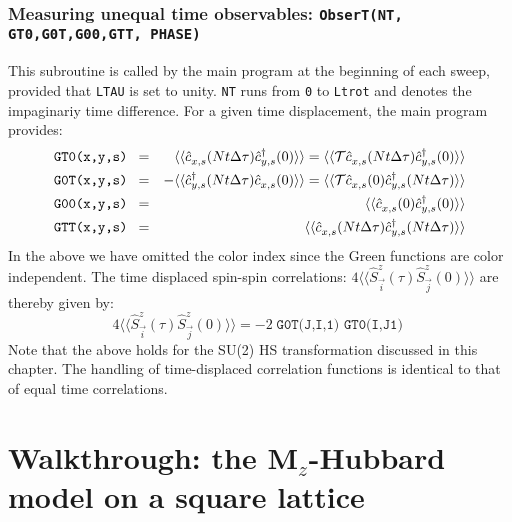 \subsubsection{Measuring  unequal time observables: \texttt{ObserT(NT,  GT0,G0T,G00,GTT, PHASE) }}

This subroutine is called by the main program at the beginning of each sweep, provided that \texttt{LTAU}  is set to unity.  \texttt{NT} runs from \texttt{0}  to \texttt{Ltrot} and denotes the   impaginariy time difference.   For a given time  displacement, the main program provides:
\begin{eqnarray}
\texttt{GT0(x,y,s) }  = & &    \langle \langle \hat{c}^{\phantom\dagger}_{x,s} (Nt \Delta \tau)   \hat{c}^{\dagger}_{y,s} (0)   \rangle \rangle = \langle \langle {\cal T} \hat{c}^{\phantom\dagger}_{x,s} (Nt \Delta \tau)   \hat{c}^{\dagger}_{y,s} (0)   \rangle \rangle  \nonumber \\
\texttt{G0T(x,y,s) }   = &&  -   \langle \langle   \hat{c}^{\dagger}_{y,s} (Nt \Delta \tau)    \hat{c}^{\phantom\dagger}_{x,s} (0)    \rangle \rangle =
    \langle \langle {\cal T} \hat{c}^{\phantom\dagger}_{x,s} (0)    \hat{c}^{\dagger}_{y,s} (Nt \Delta \tau)   \rangle \rangle  \nonumber  \\
  \texttt{G00(x,y,s) }  = & &    \langle \langle \hat{c}^{\phantom\dagger}_{x,s} (0)   \hat{c}^{\dagger}_{y,s} (0)   \rangle \rangle    \nonumber \\
    \texttt{GTT(x,y,s) }  = & &    \langle \langle \hat{c}^{\phantom\dagger}_{x,s} (Nt \Delta \tau)   \hat{c}^{\dagger}_{y,s} (Nt \Delta \tau)   \rangle \rangle    
\end{eqnarray}
In the above we have omitted the color index since  the  Green functions are color independent.  The time displaced  spin-spin correlations: 
$ 4 \langle \langle \hat{S}^{z}_{\vec{i}} (\tau)  \hat{S}^{z}_{\vec{j}} (0)\rangle \rangle   $ 
are thereby given by: 
\begin{equation}
	4 \langle \langle \hat{S}^{z}_{\vec{i}} (\tau)  \hat{S}^{z}_{\vec{j}} (0)\rangle \rangle   = - 2 \; \texttt{G0T(J,I,1) } \texttt{GT0(I,J1) } 
\end{equation}
Note that the above holds for the SU(2) HS transformation discussed in this chapter. 
The handling of time-displaced correlation functions is identical to that of equal time correlations. 




\section{Walkthrough: the M$_z$-Hubbard model on a square lattice}\label{sec:walk1.1}

